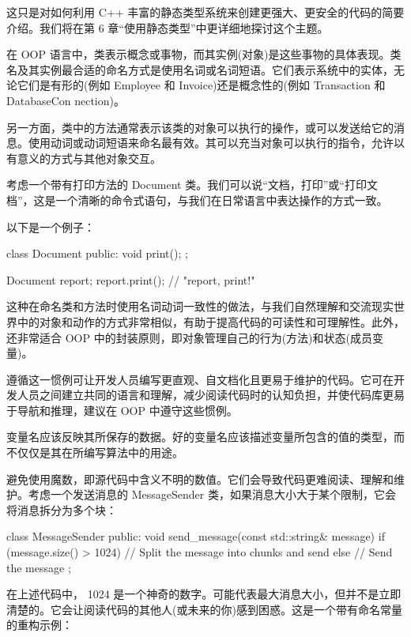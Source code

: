 这只是对如何利用 C++ 丰富的静态类型系统来创建更强大、更安全的代码的简要介绍。我们将在第 6 章“使用静态类型”中更详细地探讨这个主题。


在 OOP 语言中，类表示概念或事物，而其实例(对象)是这些事物的具体表现。类名及其实例最合适的命名方式是使用名词或名词短语。它们表示系统中的实体，无论它们是有形的(例如 Employee 和 Invoice)还是概念性的(例如 Transaction 和 DatabaseCon nection)。

另一方面，类中的方法通常表示该类的对象可以执行的操作，或可以发送给它的消息。使用动词或动词短语来命名最有效。其可以充当对象可以执行的指令，允许以有意义的方式与其他对象交互。

考虑一个带有打印方法的 Document 类。我们可以说“文档，打印”或“打印文档”，这是一个清晰的命令式语句，与我们在日常语言中表达操作的方式一致。

以下是一个例子：

\begin{cpp}
class Document {
public:
    void print();
};

Document report;
report.print(); // "report, print!"
\end{cpp}

这种在命名类和方法时使用名词动词一致性的做法，与我们自然理解和交流现实世界中的对象和动作的方式非常相似，有助于提高代码的可读性和可理解性。此外，还非常适合 OOP 中的封装原则，即对象管理自己的行为(方法)和状态(成员变量)。

遵循这一惯例可让开发人员编写更直观、自文档化且更易于维护的代码。它可在开发人员之间建立共同的语言和理解，减少阅读代码时的认知负担，并使代码库更易于导航和推理，建议在 OOP 中遵守这些惯例。


变量名应该反映其所保存的数据。好的变量名应该描述变量所包含的值的类型，而不仅仅是其在所编写算法中的用途。

避免使用魔数，即源代码中含义不明的数值。它们会导致代码更难阅读、理解和维护。考虑一个发送消息的 MessageSender 类，如果消息大小大于某个限制，它会将消息拆分为多个块：

\begin{cpp}
class MessageSender {
public:
    void send_message(const std::string& message) {
        if (message.size() > 1024) {
            // Split the message into chunks and send
        } else {
            // Send the message
        }
    }
};
\end{cpp}

在上述代码中， 1024 是一个神奇的数字。可能代表最大消息大小，但并不是立即清楚的。它会让阅读代码的其他人(或未来的你)感到困惑。这是一个带有命名常量的重构示例：

